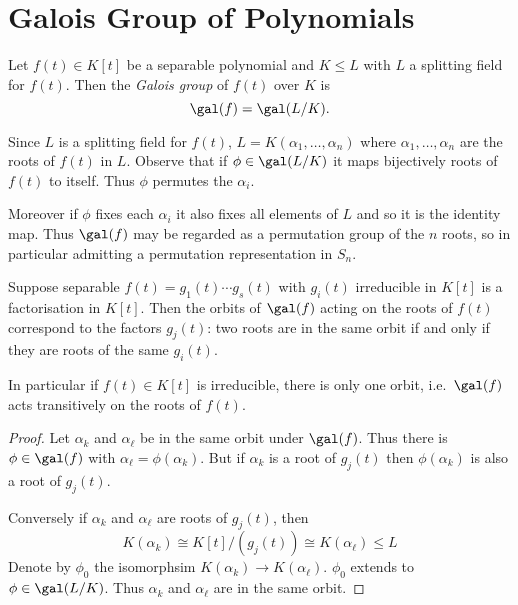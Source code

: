 \documentclass[a4paper]{article}
\begin{document}
\section{Galois Group of Polynomials}

\begin{definition}
  Let \(f(t) \in K[t]\) be a separable polynomial and \(K \leq L\) with \(L\) a splitting field for \(f(t)\). Then the \emph{Galois group} of \(f(t)\) over \(K\) is
  \[
    \gal(f) = \gal(L/K).
  \]
\end{definition}

Since \(L\) is a splitting field for \(f(t)\), \(L = K(\alpha_1, \dots, \alpha_n)\) where \(\alpha_1, \dots, \alpha_n\) are the roots of \(f(t)\) in \(L\). Observe that if \(\phi \in \gal(L/K)\) it maps bijectively roots of \(f(t)\) to itself. Thus \(\phi\) permutes the \(\alpha_i\).

Moreover if \(\phi\) fixes each \(\alpha_i\) it also fixes all elements of \(L\) and so it is the identity map. Thus \(\gal(f)\) may be regarded as a permutation group of the \(n\) roots, so in particular admitting a permutation representation in \(S_n\).

\begin{lemma}
  \label{lem:galois orbits}
  Suppose separable \(f(t) = g_1(t) \cdots g_s(t)\) with \(g_i(t)\) irreducible in \(K[t]\) is a factorisation in \(K[t]\). Then the orbits of \(\gal(f)\) acting on the roots of \(f(t)\) correspond to the factors \(g_j(t)\): two roots are in the same orbit if and only if they are roots of the same \(g_i(t)\).

  In particular if \(f(t) \in K[t]\) is irreducible, there is only one orbit, i.e.\ \(\gal(f)\) acts transitively on the roots of \(f(t)\).
\end{lemma}

\begin{proof}
  Let \(\alpha_k\) and \(\alpha_\ell\) be in the same orbit under \(\gal(f)\). Thus there is \(\phi \in \gal(f)\) with \(\alpha_\ell = \phi(\alpha_k)\). But if \(\alpha_k\) is a root of \(g_j(t)\) then \(\phi(\alpha_k)\) is also a root of \(g_j(t)\).

  Conversely if \(\alpha_k\) and \(\alpha_\ell\) are roots of \(g_j(t)\), then
  \[
    K(\alpha_k) \cong K[t]/(g_j(t)) \cong K(\alpha_\ell) \leq L
  \]
  Denote by \(\phi_0\) the isomorphsim \(K(\alpha_k) \to K(\alpha_\ell)\). \(\phi_0\) extends to \(\phi \in \gal(L/K)\). Thus \(\alpha_k\) and \(\alpha_\ell\) are in the same orbit.
\end{proof}
\end{document}
